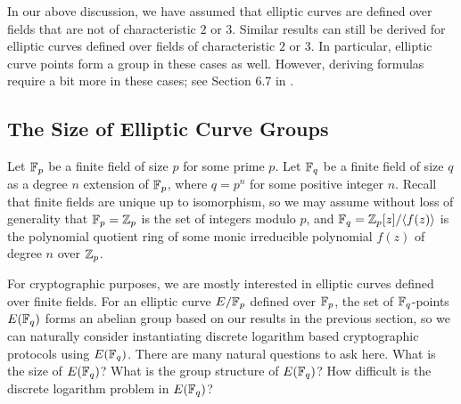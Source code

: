 \begin{remark}
    In our above discussion, we have assumed that elliptic curves are 
    defined over fields that are not of characteristic $2$ or $3$. Similar 
    results can still be derived for elliptic curves defined over fields 
    of characteristic $2$ or $3$. In particular, elliptic curve points form 
    a group in these cases as well. However, deriving formulas require a 
    bit more in these cases; see Section 6.7 in \cite{10.5555/1481183}. 
\end{remark}

\subsection{The Size of Elliptic Curve Groups}
Let $\mathbb{F}_p$ be a finite field of size $p$ for some prime $p$. Let $\mathbb{F}_q$ 
be a finite field of size $q$ as a degree $n$ extension of $\mathbb{F}_p$, where 
$q = p^n$ for some positive integer $n$. Recall that finite fields are 
unique up to isomorphism, so we may assume without loss of generality that 
$\mathbb{F}_p = \mathbb{Z}_p$ is the set of integers modulo $p$, and $\mathbb{F}_q = 
\mathbb{Z}_p[z]/\langle f(z) \rangle$ is the polynomial quotient ring of some 
monic irreducible polynomial $f(z)$ of degree $n$ over $\mathbb{Z}_p$. 

For cryptographic purposes, we are mostly interested in elliptic curves 
defined over finite fields. For an elliptic curve $E/\mathbb{F}_p$ defined over 
$\mathbb{F}_p$, the set of $\mathbb{F}_q$-points $E(\mathbb{F}_q)$ forms an abelian group based 
on our results in the previous section, so we can naturally consider 
instantiating discrete logarithm based cryptographic protocols using $E(\mathbb{F}_q)$.
There are many natural questions to ask here. What is the size of 
$E(\mathbb{F}_q)$? What is the group structure of $E(\mathbb{F}_q)$? How difficult is the 
discrete logarithm problem in $E(\mathbb{F}_q)$? 


